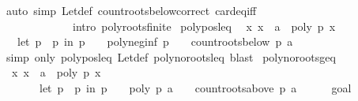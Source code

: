 \begin{isabellebody}
%
\isatagproof
{}\isamarkupfalse%
\ {\isacharparenleft}auto\ simp{\isacharcolon}\ Let{\isacharunderscore}def\ count{\isacharunderscore}roots{\isacharunderscore}below{\isacharunderscore}correct\ card{\isacharunderscore}eq{\isacharunderscore}{}{\isacharunderscore}iff\isanewline
\ \ \ \ \ \ \ \ \ \ \ \ \ intro{\isacharcolon}\ poly{\isacharunderscore}roots{\isacharunderscore}finite{\isacharparenright}%
\endisatagproof
{\isafoldproof}%
%
\isadelimproof
\isanewline
%
\endisadelimproof
\isanewline
{}\isamarkupfalse%
\ poly{\isacharunderscore}pos{\isacharunderscore}leq{\isacharcolon}\isanewline
\ \ {\isachardoublequoteopen}{\isacharparenleft}{\isasymforall}x{\isachardot}\ x\ {\isasymle}\ a\ {\isasymlongrightarrow}\ poly\ p\ x\ {\isachargreater}\ {}{\isacharparenright}\ {\isasymlongleftrightarrow}\ \isanewline
\ \ \ {\isacharparenleft}let\ p\ {\isacharequal}\ p\ in\ p\ {\isasymnoteq}\ {}\ {\isasymand}\ poly{\isacharunderscore}neg{\isacharunderscore}inf\ p\ {\isacharequal}\ {}\ {\isasymand}\ count{\isacharunderscore}roots{\isacharunderscore}below\ p\ a\ {\isacharequal}\ {}{\isacharparenright}{\isachardoublequoteclose}\isanewline
%
\isadelimproof
\ \ %
\endisadelimproof
%
\isatagproof
{}\isamarkupfalse%
\ {\isacharparenleft}simp\ only{\isacharcolon}\ poly{\isacharunderscore}pos{\isacharunderscore}leq\ Let{\isacharunderscore}def\ poly{\isacharunderscore}no{\isacharunderscore}roots{\isacharunderscore}leq{\isacharcomma}\ blast{\isacharparenright}%
\endisatagproof
{\isafoldproof}%
%
\isadelimproof
\isanewline
%
\endisadelimproof
\isanewline
\isanewline
\isanewline
{}\isamarkupfalse%
\ poly{\isacharunderscore}no{\isacharunderscore}roots{\isacharunderscore}geq{\isacharcolon}\isanewline
\ \ {\isachardoublequoteopen}{\isacharparenleft}{\isasymforall}x{\isachardot}\ x\ {\isasymge}\ a\ {\isasymlongrightarrow}\ poly\ p\ x\ {\isasymnoteq}\ {}{\isacharparenright}\ {\isasymlongleftrightarrow}\isanewline
\ \ \ \ \ \ \ {\isacharparenleft}let\ p\ {\isacharequal}\ p\ in\ {\isacharparenleft}p\ {\isasymnoteq}\ {}\ {\isasymand}\ poly\ p\ a\ {\isasymnoteq}\ {}\ {\isasymand}\ count{\isacharunderscore}roots{\isacharunderscore}above\ p\ a\ {\isacharequal}\ {}{\isacharparenright}{\isacharparenright}{\isachardoublequoteclose}\isanewline
%
\isadelimproof
%
\endisadelimproof
%
\isatagproof
{}\isamarkupfalse%
\isanewline
\ \ \isamarkupfalse%
\ goal{}\isanewline
\ \ \isamarkupfalse%

\end{isabellebody}
